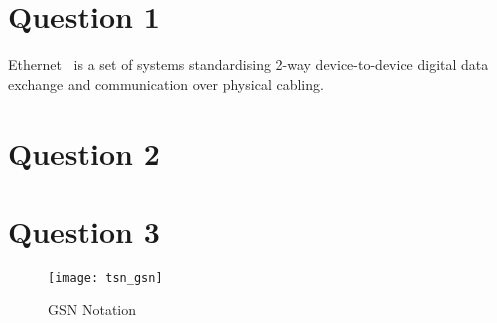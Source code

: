 \section{Question 1}


%

Ethernet~\cite{IEEEStandardEthernet2022} is a set of systems standardising 2-way device-to-device digital data exchange and communication over physical cabling.



\section{Question 2}




\section{Question 3}




\begin{figure}[h]
\centering
\texttt{[image: tsn\_gsn]}
\caption{GSN Notation}
\end{figure}
